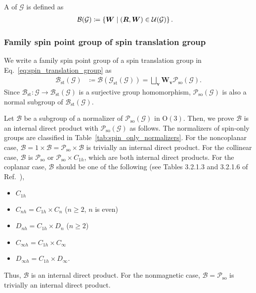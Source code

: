 A  of $\mathcal{G}$ is defined as
\begin{align}
  \mathcal{B}(\mathcal{G})
    &\coloneqq \left\{  \bm{W}  \mathrel{}\middle|\mathrel{}  (\bm{R}, \bm{W}) \in \mathcal{U}(\mathcal{G})  \right\}.
\end{align}

\subsubsection{Family spin point group of spin translation group}

We write a family spin point group of a spin translation group in Eq.~\eqref{eq:spin_translation_group} as
\begin{align}
    \label{eq:family_spg_of_stg}
    \mathcal{B}_{\mathrm{st}}(\mathcal{G})
        &\coloneqq \mathcal{B}(\mathcal{G}_{\mathrm{st}}(\mathcal{G}))
        = \bigsqcup_{ \bm{v} } \bm{W}_{\bm{v}} \mathcal{P}_{\mathrm{so}}(\mathcal{G}).
\end{align}
Since $\mathcal{B}_{\mathrm{st}}: \mathcal{G} \to \mathcal{B}_{\mathrm{st}}(\mathcal{G})$ is a surjective group homomorphism, $\mathcal{P}_{\mathrm{so}}(\mathcal{G})$ is also a normal subgroup of $\mathcal{B}_{\mathrm{st}}(\mathcal{G})$.

Let $\mathcal{B}$ be a subgroup of a normalizer of $\mathcal{P}_{\mathrm{so}}(\mathcal{G})$ in $\mathrm{O}(3)$.
Then, we prove $\mathcal{B}$ is an internal direct product with $\mathcal{P}_{\mathrm{so}}(\mathcal{G})$ as follows.
The normalizers of spin-only groups are classified in Table~\ref{tab:spin_only_normalizers}.
For the noncoplanar case, $\mathcal{B} = 1 \times \mathcal{B} = \mathcal{P}_{\mathrm{so}} \times \mathcal{B}$ is trivially an internal direct product.
For the collinear case, $\mathcal{B}$ is $\mathcal{P}_{\mathrm{so}}$ or $\mathcal{P}_{\mathrm{so}} \times C_{1h}$, which are both internal direct products.
For the coplanar case, $\mathcal{B}$ should be one of the following (see Tables 3.2.1.3 and 3.2.1.6 of Ref.~\cite{hahn2016point}),
\begin{itemize}
  \item $C_{1h}$
  \item $C_{nh} = C_{1h} \times C_{n}$ ($n \geq 2$, $n$ is even)
  \item $D_{nh} = C_{1h} \times D_{n}$ ($n \geq 2$)
  \item $C_{\infty h} = C_{1h} \times C_{\infty}$
  \item $D_{\infty h} = C_{1h} \times D_{\infty}$.
\end{itemize}
Thus, $\mathcal{B}$ is an internal direct product.
For the nonmagnetic case, $\mathcal{B} = \mathcal{P}_{\mathrm{so}}$ is trivially an internal direct product.

